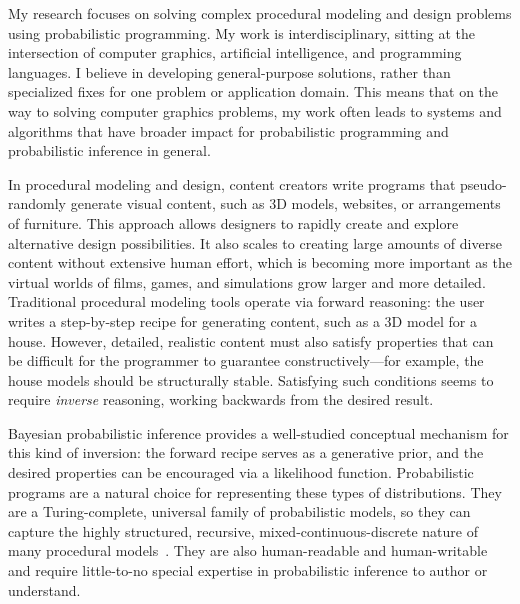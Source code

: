 \documentclass[
10pt, %
a4paper, %
oneside, %
headinclude,footinclude, %
BCOR5mm, %
]{scrartcl}
\title{\normalfont\spacedallcaps{Daniel Ritchie}} %
\author{\spacedallcaps{Research Statement}} %
\date{} %
\begin{document}

\pagestyle{scrheadings}
\clearscrheadings
\newcommand{\headertext}{\spacedlowsmallcaps{\color{black} Daniel Ritchie \color{halfgray} Research Statement}}
\ohead{\headertext}
\cfoot[\pagemark]{\pagemark}


\maketitle

My research focuses on solving complex procedural modeling and design problems using probabilistic programming. My work is interdisciplinary, sitting at the intersection of computer graphics, artificial intelligence, and programming languages. I believe in developing general-purpose solutions, rather than specialized fixes for one problem or application domain. This means that on the way to solving computer graphics problems, my work often leads to systems and algorithms that have broader impact for probabilistic programming and probabilistic inference in general.

In procedural modeling and design, content creators write programs that pseudo-randomly generate visual content, such as 3D models, websites, or arrangements of furniture. This approach allows designers to rapidly create and explore alternative design possibilities. It also scales to creating large amounts of diverse content without extensive human effort, which is becoming more important as the virtual worlds of films, games, and simulations grow larger and more detailed. Traditional procedural modeling tools operate via forward reasoning: the user writes a step-by-step recipe for generating content, such as a 3D model for a house. However, detailed, realistic content must also satisfy properties that can be difficult for the programmer to guarantee constructively---for example, the house models should be structurally stable. Satisfying such conditions seems to require \emph{inverse} reasoning, working backwards from the desired result.

Bayesian probabilistic inference provides a well-studied conceptual mechanism for this kind of inversion: the forward recipe serves as a generative prior, and the desired properties can be encouraged via a likelihood function. Probabilistic programs are a natural choice for representing these types of distributions. They are a Turing-complete, universal family of probabilistic models, so they can capture the highly structured, recursive, mixed-continuous-discrete nature of many procedural models~\cite{Church}. They are also human-readable and human-writable and require little-to-no special expertise in probabilistic inference to author or understand.
\end{document}
